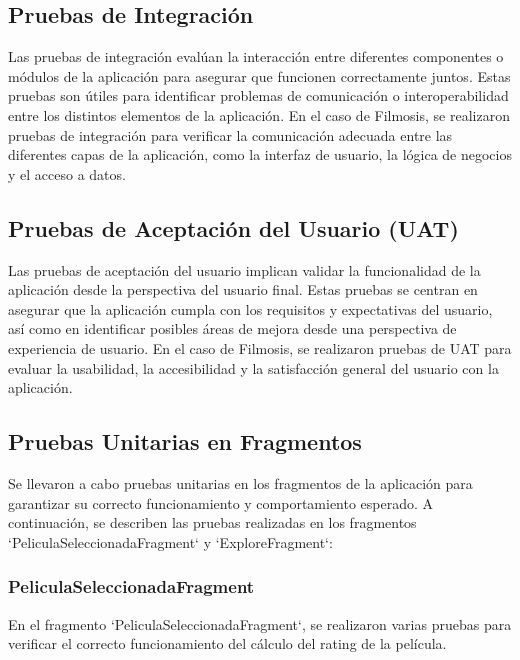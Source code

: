 \documentclass{article}
\begin{document}
\subsection{Pruebas de Integración}

Las pruebas de integración evalúan la interacción entre diferentes componentes o módulos de la aplicación para asegurar que funcionen correctamente juntos. Estas pruebas son útiles para identificar problemas de comunicación o interoperabilidad entre los distintos elementos de la aplicación. En el caso de Filmosis, se realizaron pruebas de integración para verificar la comunicación adecuada entre las diferentes capas de la aplicación, como la interfaz de usuario, la lógica de negocios y el acceso a datos.

\subsection{Pruebas de Aceptación del Usuario (UAT)}

Las pruebas de aceptación del usuario implican validar la funcionalidad de la aplicación desde la perspectiva del usuario final. Estas pruebas se centran en asegurar que la aplicación cumpla con los requisitos y expectativas del usuario, así como en identificar posibles áreas de mejora desde una perspectiva de experiencia de usuario. En el caso de Filmosis, se realizaron pruebas de UAT para evaluar la usabilidad, la accesibilidad y la satisfacción general del usuario con la aplicación.

\subsection{Pruebas Unitarias en Fragmentos}

Se llevaron a cabo pruebas unitarias en los fragmentos de la aplicación para garantizar su correcto funcionamiento y comportamiento esperado. A continuación, se describen las pruebas realizadas en los fragmentos `PeliculaSeleccionadaFragment` y `ExploreFragment`:

\subsubsection{PeliculaSeleccionadaFragment}

En el fragmento `PeliculaSeleccionadaFragment`, se realizaron varias pruebas para verificar el correcto funcionamiento del cálculo del rating de la película.
\end{document}
